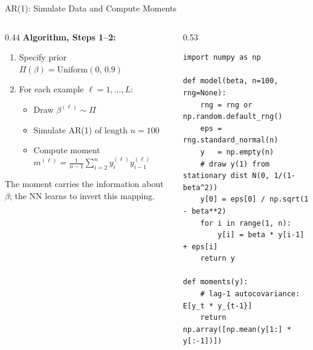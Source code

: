 \documentclass[aspectratio=169,professionalfonts]{beamer}
\newcommand{\hl}[1]{\textbf{\textcolor{UGARed}{#1}}}
\begin{document}
\begin{frame}[fragile]{AR(1): Simulate Data and Compute Moments}
  \begin{columns}[T]
    \begin{column}{0.44\textwidth}
      \hl{Algorithm, Steps 1--2:}
      \begin{enumerate}
        \item Specify prior $\Pi(\beta) = \mathrm{Uniform}(0,\, 0.9)$
        \item For each example $\ell = 1, \ldots, L$:
          \begin{itemize}
            \item Draw $\beta^{(\ell)} \sim \Pi$
            \item Simulate AR(1) of length $n = 100$
            \item Compute moment $m^{(\ell)} = \frac{1}{n-1}\sum_{i=2}^n y_i^{(\ell)} y_{i-1}^{(\ell)}$
          \end{itemize}
      \end{enumerate}
      \vspace{0.4cm}
      The moment carries the information about $\beta$; the NN learns to invert this mapping.
    \end{column}
    \begin{column}{0.53\textwidth}
\begin{verbatim}
import numpy as np

def model(beta, n=100, rng=None):
    rng = rng or np.random.default_rng()
    eps = rng.standard_normal(n)
    y   = np.empty(n)
    # draw y(1) from stationary dist N(0, 1/(1-beta^2))
    y[0] = eps[0] / np.sqrt(1 - beta**2)
    for i in range(1, n):
        y[i] = beta * y[i-1] + eps[i]
    return y

def moments(y):
    # lag-1 autocovariance: E[y_t * y_{t-1}]
    return np.array([np.mean(y[1:] * y[:-1])])
\end{verbatim}
    \end{column}
  \end{columns}
\end{frame}
\end{document}
